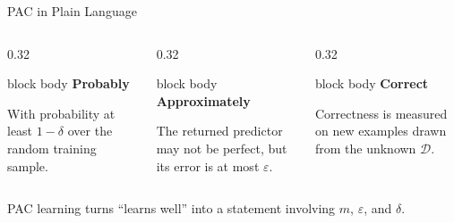 \documentclass[aspectratio=169,10pt]{beamer}
\newcommand{\D}{\mathcal{D}}
\newcommand{\eps}{\varepsilon}
\begin{document}
\begin{frame}[t]{PAC in Plain Language}
  \vspace{0.24cm}
  \begin{columns}[T,totalwidth=\textwidth]
    \begin{column}{0.32\textwidth}
      \begin{beamercolorbox}[rounded=true,sep=0.25cm,wd=\linewidth,center]{block body}
        \centering
        {\fontsize{18}{22}\selectfont\bfseries Probably}\par
        \vspace{0.18cm}
        {\normalsize With probability at least $1-\delta$ over the random training sample.}
      \end{beamercolorbox}
    \end{column}
    \begin{column}{0.32\textwidth}
      \begin{beamercolorbox}[rounded=true,sep=0.25cm,wd=\linewidth,center]{block body}
        \centering
        {\fontsize{18}{22}\selectfont\bfseries Approximately}\par
        \vspace{0.18cm}
        {\normalsize The returned predictor may not be perfect, but its error is at most $\eps$.}
      \end{beamercolorbox}
    \end{column}
    \begin{column}{0.32\textwidth}
      \begin{beamercolorbox}[rounded=true,sep=0.25cm,wd=\linewidth,center]{block body}
        \centering
        {\fontsize{18}{22}\selectfont\bfseries Correct}\par
        \vspace{0.18cm}
        {\normalsize Correctness is measured on new examples drawn from the unknown $\D$.}
      \end{beamercolorbox}
    \end{column}
  \end{columns}
  \vspace{0.45cm}
  \centering
  {\fontsize{17}{21}\selectfont PAC learning turns ``learns well'' into a statement involving $m$, $\eps$, and $\delta$.}
\end{frame}
\end{document}
